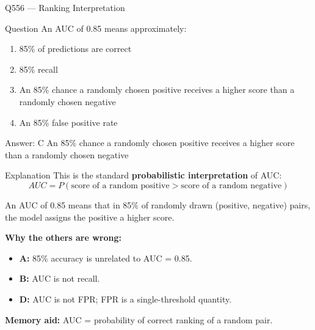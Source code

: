 \documentclass[aspectratio=169,8pt]{beamer}
\begin{document}
	\begin{frame}{Q556 --- Ranking Interpretation}
		\begin{block}{Question}
			An AUC of 0.85 means approximately:
			\begin{enumerate}
				\item 85\% of predictions are correct
				\item 85\% recall
				\item An 85\% chance a randomly chosen positive receives a higher score than a randomly chosen negative
				\item An 85\% false positive rate
			\end{enumerate}
		\end{block}
		
		\begin{exampleblock}{Answer: C}
			An 85\% chance a randomly chosen positive receives a higher score than a randomly chosen negative
		\end{exampleblock}
		
		\begin{block}{Explanation}
			This is the standard \textbf{probabilistic interpretation} of AUC:
			\[
			AUC = P(\text{score of a random positive} > \text{score of a random negative})
			\]
			
			An AUC of 0.85 means that in 85\% of randomly drawn (positive, negative) pairs,
			the model assigns the positive a higher score.
			
			\textbf{Why the others are wrong:}
			\begin{itemize}
				\item \textbf{A:} 85\% accuracy is unrelated to AUC = 0.85.
				\item \textbf{B:} AUC is not recall.
				\item \textbf{D:} AUC is not FPR; FPR is a single-threshold quantity.
			\end{itemize}
			
			\textbf{Memory aid:} AUC = probability of correct ranking of a random pair.
		\end{block}
	\end{frame}
	
\end{document}

